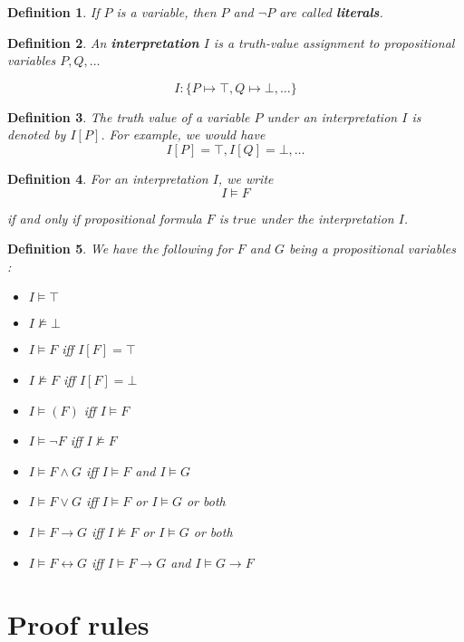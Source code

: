 \documentclass[a4paper,11pt]{report}
\newtheorem*{mydef}{Definition}
\begin{document}
\begin{mydef}
  If $P$ is a variable, then $P$ and $\neg P$ are called \textbf{literals}.
\end{mydef}

\begin{mydef}
  An \textbf{interpretation} $I$ is a truth-value assignment to propositional
  variables $P, Q, \dots$
  
  \[
    I : \{ P \mapsto \top, Q \mapsto \bot, \dots\}
  \]
\end{mydef}

\begin{mydef}
  The truth value of a variable $P$ under an interpretation $I$ is denoted by
  $I[P]$. For example, we would have
  \[
    I[P] = \top, I[Q] = \bot, \dots
  \]
\end{mydef}

\begin{mydef}
  For an interpretation $I$, we write
  \[
    I \models F
  \]

  if and only if propositional formula $F$ is $true$ under the interpretation
  $I$.
\end{mydef}

\begin{mydef}
  We have the following for $F$ and $G$ being a propositional variables :
  \begin{itemize}
  \item $I \models \top$
  \item $I \not\models \bot$
  \item $ I \models F$ iff $I[F] = \top$
  \item $ I \not\models F$ iff $I[F] = \bot$
  \item $ I \models (F)$ iff $I \models F$
  \item $ I \models \neg F$ iff $I \not\models F$
  \item $ I \models F \wedge G $ iff $I \models F$ and $I \models G$
  \item $ I \models F \vee G $ iff $ I \models F $ or $I \models G$ or both
  \item $ I \models F \to G $ iff $ I \not \models F $ or $I \models G$ or both
  \item $ I \models F \leftrightarrow G $ iff $ I \models F \to G $ and $I
    \models G \to F$
  \end{itemize}
\end{mydef}

\section{Proof rules}
\end{document}
